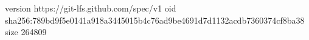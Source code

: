 version https://git-lfs.github.com/spec/v1
oid sha256:789bd9f5e0141a918a3445015b4c76ad9be4691d7d1132acdb7360374cf8ba38
size 264809
